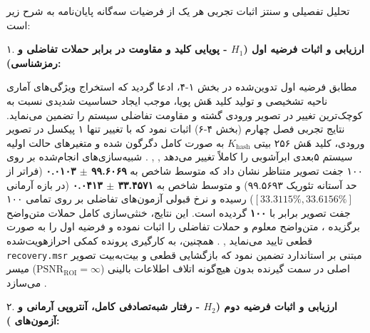 

تحلیل تفصیلی و سنتز اثبات تجربی هر یک از فرضیات سه‌گانه پایان‌نامه به شرح زیر است:\par



۱. \textbf{ارزیابی و اثبات فرضیه اول ($H_1$ {-} پویایی کلید و مقاومت در برابر حملات تفاضلی و رمزشناسی):}\par

مطابق فرضیه اول تدوین‌شده در بخش ۱{-}۴، ادعا گردید که استخراج ویژگی‌های آماری ناحیه تشخیصی  و تولید کلید هَش پویا، موجب ایجاد حساسیت شدیدی نسبت به کوچک‌ترین تغییر در تصویر ورودی گشته و مقاومت تفاضلی سیستم را تضمین می‌نماید. نتایج تجربی فصل چهارم (بخش ۴{-}۶) اثبات نمود که با تغییر تنها ۱ پیکسل در تصویر ورودی، کلید هَش ۲۵۶ بیتی $K_{\mathrm{hash}}$ به صورت کامل دگرگون شده و متغیرهای حالت اولیه سیستم ۵بعدی ابرآشوبی را کاملاً تغییر می‌دهد , , . شبیه‌سازی‌های انجام‌شده بر روی ۱۰۰ جفت تصویر متناظر نشان داد که متوسط شاخص  به \textbf{۹۹.۶۰۶۹ \ensuremath{\pm} ۰.۰۱۰۳} (فراتر از حد آستانه تئوریک ۹۹.۵۶۹۳) و متوسط شاخص  به \textbf{۳۳.۴۵۷۱ \ensuremath{\pm} ۰.۰۴۱۳} (در بازه آرمانی $[33.3115\%,\allowbreak{} 33.6156\%]$) رسیده و نرخ قبولی آزمون‌های تفاضلی بر روی تمامی ۱۰۰ جفت تصویر برابر با \textbf{۱۰۰} گردیده است. این نتایج، خنثی‌سازی کامل حملات متن‌واضح برگزیده ، متن‌واضح معلوم  و حملات تفاضلی را اثبات نموده و فرضیه اول را به صورت قطعی تایید می‌نماید , . همچنین، به کارگیری پرونده کمکی احرازهویت‌شده  \texttt{recovery.msr} مبتنی بر استاندارد  تضمین نمود که بازگشایی قطعی و بیت‌به‌بیت تصویر اصلی در سمت گیرنده بدون هیچ‌گونه اتلاف اطلاعات بالینی ($\text{PSNR}_{\mathrm{ROI}} = \infty$) میسر می‌سازد .\par



۲. \textbf{ارزیابی و اثبات فرضیه دوم ($H_2$ {-} رفتار شبه‌تصادفی کامل، آنتروپی آرمانی و آزمون‌های ):}\par

